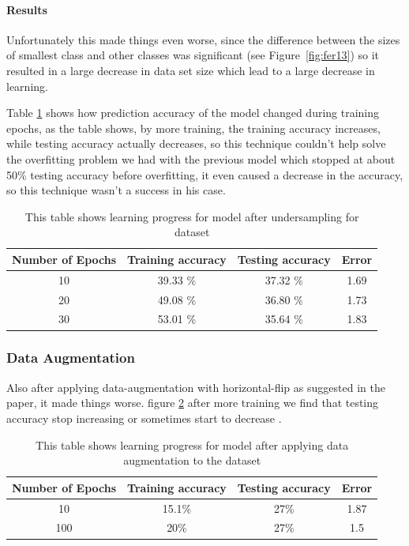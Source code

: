 \paragraph{Results}
Unfortunately this made things even worse, since the difference between the sizes of smallest class and other classes was significant (see Figure~\ref{fig:fer13}) so it resulted in a large decrease in data set size which lead to a large decrease in learning.\newline

Table \ref{tab:table1} shows how prediction accuracy of the model changed during training epochs, as the table shows, by more training, the training accuracy increases, while testing accuracy actually decreases, so this technique couldn't help solve the overfitting problem we had with the previous model which stopped at about 50\% testing accuracy before overfitting, it even caused a decrease in the accuracy, so this technique wasn't a success in his case. 
\begin{table}[h!]
	\centering
	\caption{This table shows learning progress for model after undersampling for dataset}
	\label{tab:table1}
	\begin{tabular}{c | c | c | c}
		\textbf{Number of Epochs} & \textbf{Training accuracy} & \textbf{Testing accuracy} & \textbf{Error}\\ \hline 
		10 & 39.33 \% & 37.32 \% & 1.69 \\
		20 & 49.08 \% & 36.80 \% & 1.73 \\
		30 & 53.01 \% & 35.64 \% & 1.83 \\
	\end{tabular}
\end{table}

\subsubsection{Data Augmentation}
Also after applying data-augmentation with horizontal-flip as suggested in the paper\cite{state_of_art}, it made things worse.\newline
figure \ref{tab:table12} after more training we find that testing accuracy stop increasing or sometimes start to decrease .
\begin{table}[h!]
	\centering
	\caption{This table shows learning progress for model after applying data augmentation to the dataset}
	\label{tab:table12}
	\begin{tabular}{c | c | c | c}
		\textbf{Number of Epochs} & \textbf{Training accuracy} & \textbf{Testing accuracy} & \textbf{Error}\\ \hline 
		10 & 15.1\% & 27\% & 1.87 \\
		100 & 20\% &  27\% & 1.5 \\
	\end{tabular}
\end{table}

